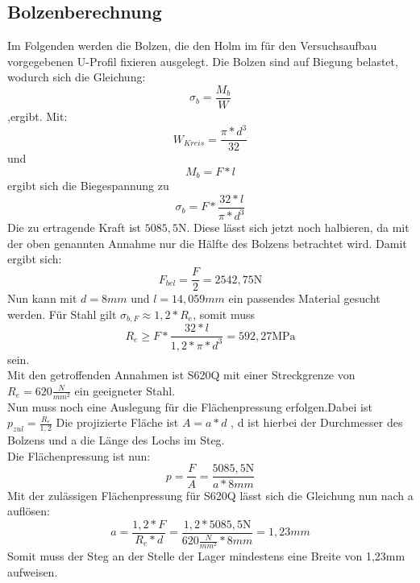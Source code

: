 
\subsection{Bolzenberechnung}
Im Folgenden werden die Bolzen, die den Holm im für den Versuchsaufbau vorgegebenen U-Profil fixieren ausgelegt. Die Bolzen sind auf Biegung belastet, wodurch sich die Gleichung:
$$\sigma_{b}=\frac{M_{b}}{W} $$
 ,ergibt.
 Mit: $$W_{Kreis}=\frac{\pi*d^{3}}{32}$$
 und $$M_{b}=F*l$$
 ergibt sich die Biegespannung zu
 $$\sigma_{b}=F*\frac{32*l}{\pi*d^{3}}$$
Die zu ertragende Kraft ist $5085,5 \mathrm{N}$. Diese lässt sich jetzt noch halbieren, da mit der oben genannten Annahme nur die Hälfte des Bolzens betrachtet wird. Damit ergibt sich:
 $$F_{bel}=\frac{F}{2} =2542,75 \mathrm{N}$$
 Nun kann mit $d=8mm$ und $l=14,059mm$ ein passendes Material gesucht werden. Für Stahl gilt $\sigma_{b,F}\approx1,2*R_{e}$, somit muss $$R_{e}\geq F*\frac{32*l}{1,2*\pi*d^{3}}=592,27\mathrm{MPa}$$ sein.\\
 Mit den getroffenden Annahmen ist S620Q mit einer Streckgrenze von $R_{e}=620\frac{N}{mm^{2}}$ ein geeigneter Stahl.\\
Nun muss noch eine Auslegung für die Flächenpressung erfolgen.Dabei ist $p_{zul}=\frac{R_{e}}{1,2}$
Die projizierte Fläche ist $A=a*d$ , d ist hierbei der Durchmesser des Bolzens und a die Länge des Lochs im Steg.\\
Die Flächenpressung ist nun: $$p=\frac{F}{A}=\frac{5085,5\mathrm{N}}{a*8mm}$$
Mit der zulässigen Flächenpressung für S620Q lässt sich die Gleichung nun nach a auflösen:
$$a=\frac{1,2*F}{R_{e}*d}=\frac{1,2*5085,5\mathrm{N}}{620\frac{N}{mm^{2}}*8mm}=1,23mm$$
Somit muss der Steg an der Stelle der Lager mindestens eine Breite von 1,23$\mathrm{mm}$ aufweisen.\cite{item6}
 
 
 
 
  
 
